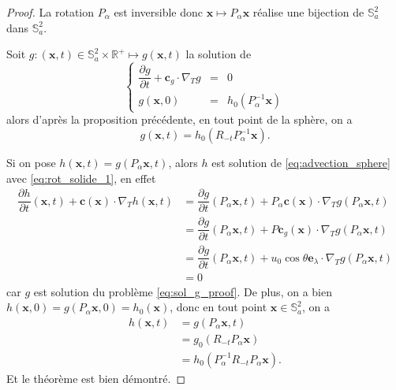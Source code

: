 \begin{proof}
La rotation $P_{\alpha}$ est inversible donc $\mathbf{x} \mapsto P_{\alpha} \mathbf{x}$ réalise une bijection de $\mathbb{S}_a^2$ dans $\mathbb{S}_a^2$.

Soit $g : (\mathbf{x},t) \in \mathbb{S}_a^2 \times \mathbb{R}^+ \mapsto g(\mathbf{x},t)$ la solution de 
\begin{equation}
\left\lbrace
\begin{array}{rcl}
\dfrac{\partial g}{\partial t} + \mathbf{c}_g \cdot \nabla_T g & = & 0\\
g(\mathbf{x},0) & = & h_0(P_{\alpha}^{-1}\mathbf{x})
\end{array}
\right.
\label{eq:sol_g_proof}
\end{equation}
alors d'après la proposition précédente, en tout point de la sphère, on a
\begin{equation}
g(\mathbf{x},t) = h_0(R_{-t} P_{\alpha}^{-1}\mathbf{x}).
\end{equation}

Si on pose $h(\mathbf{x},t) = g(P_{\alpha} \mathbf{x} ,t)$, alors $h$ est solution de \eqref{eq:advection_sphere} avec \eqref{eq:rot_solide_1}, en effet
\begin{align*}
\dfrac{\partial h}{\partial t} (\mathbf{x},t) + \mathbf{c}(\mathbf{x}) \cdot \nabla_T h(\mathbf{x},t) & = \dfrac{\partial g}{\partial t} (P_{\alpha}\mathbf{x},t) + P_{\alpha} \mathbf{c}(\mathbf{x}) \cdot \nabla_T g (P_{\alpha}\mathbf{x},t) \\
	& = \dfrac{\partial g}{\partial t} (P_{\alpha}\mathbf{x},t) + P\mathbf{c}_g(\mathbf{x}) \cdot \nabla_T g (P_{\alpha}\mathbf{x},t) \\
	& = \dfrac{\partial g}{\partial t} (P_{\alpha}\mathbf{x},t) + u_0 \cos \theta \mathbf{e}_{\lambda} \cdot \nabla_T g (P_{\alpha}\mathbf{x},t) \\
	& = 0
\end{align*}
car $g$ est solution du problème \eqref{eq:sol_g_proof}.
De plus, on a bien $h(\mathbf{x},0) = g(P_{\alpha} \mathbf{x} ,0) = h_0(\mathbf{x})$, donc en tout point $\mathbf{x} \in \mathbb{S}_a^2$, on a
\begin{align*}
h(\mathbf{x},t) & = g(P_{\alpha} \mathbf{x}, t) \\
	& = g_0(R_{-t} P_{\alpha} \mathbf{x} ) \\
	& = h_0(P_{\alpha}^{-1}R_{-t}P_{\alpha} \mathbf{x}).
\end{align*}
Et le théorème est bien démontré.
\end{proof}

